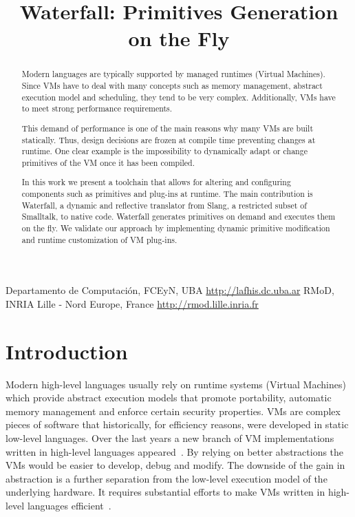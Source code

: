 \documentclass[10pt,preprint,letter]{sigplanconf}
\newcommand{\ST}  {Small\-talk\xspace}
\newcommand{\W}{Waterfall\xspace}
\begin{document}
\title{\W: Primitives Generation on the Fly}

    {Departamento de Computación, FCEyN, UBA}
    {\url{http://lafhis.dc.uba.ar}}
    {RMoD, INRIA Lille - Nord Europe, France}
    {\url{http://rmod.lille.inria.fr}}

\maketitle







\begin{abstract}
Modern languages are typically supported by managed runtimes (Virtual Machines). 
Since VMs have to deal with many concepts such as memory management, abstract execution model and scheduling, they tend to be very complex.
Additionally, VMs have to meet strong performance requirements. 

This demand of performance is one of the main reasons why many VMs are built statically. 
Thus, design decisions are frozen at compile time preventing changes at runtime.
One clear example is the impossibility to dynamically adapt or change primitives of the VM once it has been compiled.
  
In this work we present a toolchain that allows for altering and configuring components such as primitives and plug-ins at runtime. 
The main contribution is \W, a dynamic and reflective translator from Slang, a restricted subset of \ST, to native code.
\W generates primitives on demand and executes them on the fly. 
We validate our approach by implementing dynamic primitive modification and runtime customization of VM plug-ins.
\end{abstract}

\section{Introduction}
Modern high-level languages usually rely on runtime systems (Virtual Machines) which provide abstract execution models that promote portability, automatic memory management and enforce certain security properties. 
VMs are complex pieces of software that historically, for efficiency reasons, were developed in static low-level languages. 
Over the last years a new branch of VM implementations written in high-level languages appeared~\cite{Folla}.
By relying on better abstractions the VMs would be easier to develop, debug and modify. 
The downside of the gain in abstraction is a further separation from the low-level execution model of the underlying hardware. 
It requires substantial efforts to make VMs written in high-level languages efficient~\cite{Rigo06a}.
\end{document}
